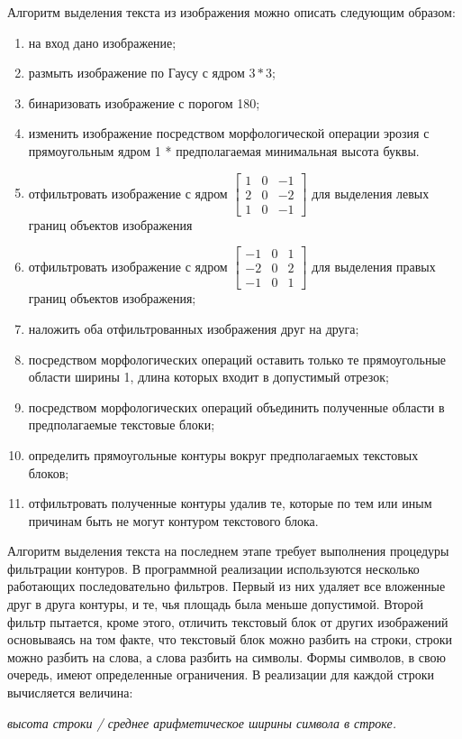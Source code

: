 \documentclass[oneside,final,14pt]{extreport}
\begin{document}
Алгоритм выделения текста из изображения можно описать следующим образом:
\begin{enumerate}
\item на вход дано изображение;
\item размыть изображение по Гаусу с ядром $3*3$;
\item бинаризовать изображение с порогом 180;
\item изменить изображение посредством морфологической операции эрозия с прямоугольным ядром 1 * предполагаемая минимальная высота буквы. 
\item отфильтровать изображение с ядром  
$\begin{bmatrix}
1 & 0 & -1 \\
2 & 0 & -2 \\
1 & 0 & -1
\end{bmatrix}$ для выделения левых границ объектов изображения
\item отфильтровать изображение с ядром 
$\begin{bmatrix}
-1 & 0 &  1 \\
-2 & 0 &  2 \\
-1 & 0 &  1
\end{bmatrix}$ для выделения правых границ объектов изображения;
\item наложить оба отфильтрованных изображения друг на друга;
\item посредством морфологических операций оставить только те прямоугольные области ширины 1, длина которых  входит в допустимый отрезок;
\item посредством морфологических операций объединить полученные области в предполагаемые текстовые блоки;
\item определить прямоугольные контуры вокруг предполагаемых текстовых блоков;
\item отфильтровать полученные контуры удалив те, которые по тем или иным причинам быть не могут контуром текстового блока.
\end{enumerate}

Алгоритм выделения текста на последнем этапе требует выполнения процедуры фильтрации контуров. В программной реализации используются несколько работающих последовательно фильтров. Первый из них удаляет все вложенные друг в друга контуры, и те, чья площадь была меньше допустимой. Второй фильтр пытается, кроме этого, отличить текстовый блок от других изображений основываясь на том факте, что текстовый блок можно разбить на строки, строки можно разбить на слова, а слова разбить на символы. Формы символов, в свою очередь, имеют определенные ограничения. В реализации для каждой строки вычисляется величина:
\begin{center}
\textit{
высота строки / среднее арифметическое ширины символа в строке.
}
\end{center}
\end{document}
